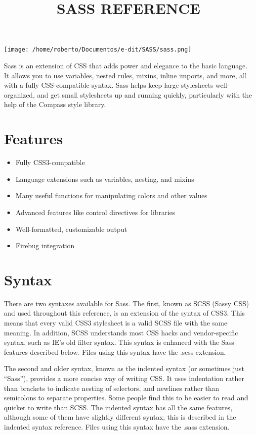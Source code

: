 \documentclass[9pt]{article}
\title{SASS REFERENCE}
\begin{document}
\begin{titlepage}
\pagestyle{plain}
\begin{center}
\vspace*{0.3\textheight}
\texttt{[image: /home/roberto/Documentos/e-dit/SASS/sass.png]}\\[5pt]
\vfill
\end{center}
\end{titlepage}

\tableofcontents

\newpage
\setcounter{page}{1}

 Sass is an extension of CSS that adds power and elegance to the basic language. It allows you to use variables, nested rules, mixins, inline imports, and more, all with a fully CSS-compatible syntax. Sass helps keep large stylesheets well-organized, and get small stylesheets up and running quickly, particularly with the help of the Compass style library.
\section{Features}
\begin{itemize}
\item Fully CSS3-compatible
\item Language extensions such as variables, nesting, and mixins
\item Many useful functions for manipulating colors and other values
\item Advanced features like control directives for libraries
\item Well-formatted, customizable output
\item Firebug integration

\end{itemize}
\section{Syntax}


 There are two syntaxes available for Sass. The first, known as SCSS (Sassy CSS) and used throughout this reference, is an extension of the syntax of CSS3. This means that every valid CSS3 stylesheet is a valid SCSS file with the same meaning. In addition, SCSS understands most CSS hacks and vendor-specific syntax, such as IE’s old filter syntax. This syntax is enhanced with the Sass features described below. Files using this syntax have the .scss extension.


 The second and older syntax, known as the indented syntax (or sometimes just “Sass”), provides a more concise way of writing CSS. It uses indentation rather than brackets to indicate nesting of selectors, and newlines rather than semicolons to separate properties. Some people find this to be easier to read and quicker to write than SCSS. The indented syntax has all the same features, although some of them have slightly different syntax; this is described in the indented syntax reference. Files using this syntax have the .sass extension.
\end{document}
